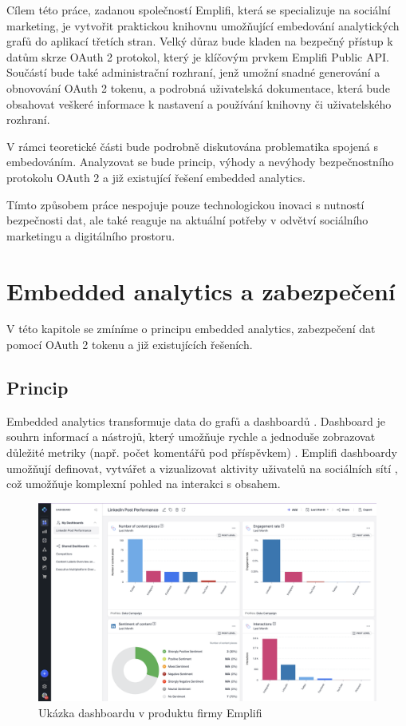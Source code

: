 \documentclass[czech, bc, kiv, he, iso690numb]{fasthesis}
\begin{document}
Cílem této práce, zadanou společností Emplifi, která se specializuje na sociální marketing, je vytvořit praktickou knihovnu umožňující embedování analytických grafů do aplikací třetích stran. 
Velký důraz bude kladen na bezpečný přístup k datům skrze OAuth 2 protokol, který je klíčovým prvkem Emplifi Public API. Součástí bude také administrační rozhraní, jenž umožní snadné generování a obnovování OAuth 2 tokenu, a podrobná uživatelská dokumentace, která bude obsahovat veškeré informace k nastavení a používání knihovny či uživatelského rozhraní.

V rámci teoretické části bude podrobně diskutována problematika spojená s embedováním. Analyzovat se bude princip, výhody a nevýhody bezpečnostního protokolu OAuth 2 a již existující řešení embedded analytics.

Tímto způsobem práce nespojuje pouze technologickou inovaci s nutností bezpečnosti dat, ale také reaguje na aktuální potřeby v odvětví sociálního marketingu a digitálního prostoru.
%
%
%
%
\chapter{Embedded analytics a zabezpečení}
V této kapitole se zmíníme o principu embedded analytics, zabezpečení dat pomocí OAuth 2 tokenu a již existujících řešeních.

%
%
\section{Princip}
Embedded analytics transformuje data do grafů a dashboardů \cite{goodDataEmbedded}. Dashboard je souhrn informací a nástrojů, který umožňuje rychle a jednoduše zobrazovat důležité metriky (např. počet komentářů pod příspěvkem) \cite{coJeDashboard}.
Emplifi dashboardy umožňují definovat, vytvářet a vizualizovat aktivity uživatelů na sociálních sítí \cite{emplifiDashboard}, což umožňuje komplexní pohled na interakci s obsahem.

\begin{figure}
	\centering
	\includegraphics[width=1\textwidth]{pictures/emplifi-dashboard-example.png}
	\caption{Ukázka dashboardu v produktu firmy Emplifi}
	\label{fig:emplifiDashUkazka}
\end{figure}
\end{document}
